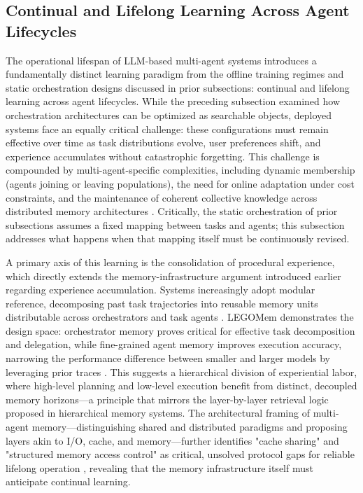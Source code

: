 \documentclass[11pt,a4paper]{article}
\begin{document}
\subsection{Continual and Lifelong Learning Across Agent Lifecycles}


The operational lifespan of LLM-based multi-agent systems introduces a fundamentally distinct learning paradigm from the offline training regimes and static orchestration designs discussed in prior subsections: continual and lifelong learning across agent lifecycles. While the preceding subsection examined how orchestration architectures can be optimized as searchable objects, deployed systems face an equally critical challenge: these configurations must remain effective over time as task distributions evolve, user preferences shift, and experience accumulates without catastrophic forgetting. This challenge is compounded by multi-agent-specific complexities, including dynamic membership (agents joining or leaving populations), the need for online adaptation under cost constraints, and the maintenance of coherent collective knowledge across distributed memory architectures \cite{arxiv:2603.10062v2}. Critically, the static orchestration of prior subsections assumes a fixed mapping between tasks and agents; this subsection addresses what happens when that mapping itself must be continuously revised.

A primary axis of this learning is the consolidation of procedural experience, which directly extends the memory-infrastructure argument introduced earlier regarding experience accumulation. Systems increasingly adopt modular reference, decomposing past task trajectories into reusable memory units distributable across orchestrators and task agents \cite{arxiv:2410.06153v3}. LEGOMem demonstrates the design space: orchestrator memory proves critical for effective task decomposition and delegation, while fine-grained agent memory improves execution accuracy, narrowing the performance difference between smaller and larger models by leveraging prior traces \cite{arxiv:2410.06153v3}. This suggests a hierarchical division of experiential labor, where high-level planning and low-level execution benefit from distinct, decoupled memory horizons---a principle that mirrors the layer-by-layer retrieval logic proposed in hierarchical memory systems. The architectural framing of multi-agent memory---distinguishing shared and distributed paradigms and proposing layers akin to I/O, cache, and memory---further identifies "cache sharing" and "structured memory access control" as critical, unsolved protocol gaps for reliable lifelong operation \cite{arxiv:2603.10062v2}, revealing that the memory infrastructure itself must anticipate continual learning.
\end{document}
